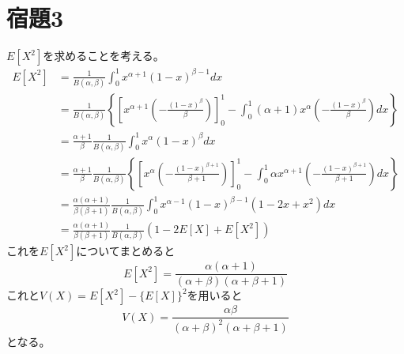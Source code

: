 \documentclass[10pt,a4paper]{ltjsarticle}       %
\begin{document}
\section{宿題3}
$E[X^2]$を求めることを考える。
\begin{align}
E[X^2] &= \frac{1}{B(\alpha, \beta)} \int_0^1 x^{\alpha+1}(1 - x)^{\beta-1} dx \\
            &= \frac{1}{B(\alpha, \beta)} \left\{ \left[ x^{\alpha+1} \left(-\frac{(1-x)^{\beta}}{\beta}\right) \right]_0^1 - \int_0^1 (\alpha+1)x^{\alpha} \left( -\frac{(1-x)^{\beta}}{\beta}\right) dx \right\} \\
            &= \frac{\alpha+1}{\beta} \frac{1}{B(\alpha, \beta)} \int_0^1 x^{\alpha} (1 - x)^{\beta} dx \\
            &= \frac{\alpha+1}{\beta} \frac{1}{B(\alpha, \beta)} \left\{ \left[ x^{\alpha}\left(  -\frac{(1 - x)^{\beta+1}}{\beta + 1} \right) \right]_0^1  -  \int_0^1  \alpha x^{\alpha+1} \left(  -\frac{(1 - x)^{\beta+1}}{\beta + 1} \right) dx \right\} \\
            &= \frac{
              \alpha (\alpha + 1)
            }{
              \beta (\beta + 1)
            } \frac{1}{
              B(\alpha, \beta)
            } \int_0^1 x^{\alpha - 1} (1 - x)^{\beta - 1} (1 - 2x + x^2) dx \\
            &= \frac{
              \alpha (\alpha + 1)
            }{
              \beta (\beta + 1)
            } \frac{1}{
              B(\alpha, \beta)
            }(1 - 2E[X] + E[X^2])
\end{align}
これを$E[X^2]$についてまとめると
\begin{equation}
  E[X^2] = \frac{
    \alpha ( \alpha + 1)
  }{
    (\alpha + \beta) ( \alpha + \beta + 1)
  }
\end{equation}
これと$V(X) = E[X^2] - \{ E[X] \}^2$を用いると
\begin{equation}V(X) = \frac{\alpha\beta}{(\alpha + \beta)^2(\alpha + \beta + 1)}\end{equation}
となる。
\end{document}

